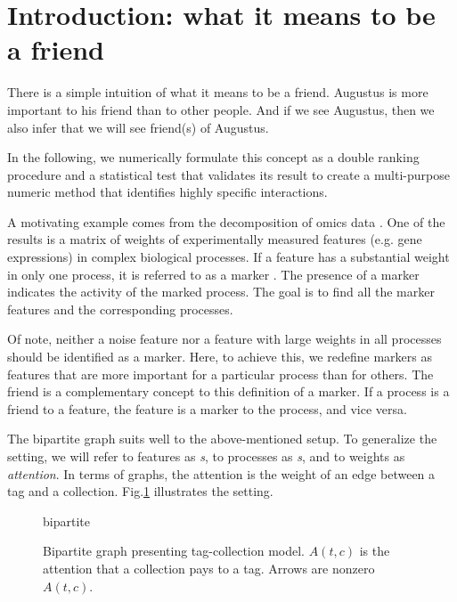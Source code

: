 \documentclass{llncs}
\begin{document}

\section{Introduction: what it means to be a friend}

There is a simple intuition of what it means to be a friend. Augustus is more important to his friend than to other people. And if we see Augustus, then we also infer that we will see friend(s) of Augustus. 

In the following, we numerically formulate this concept as a double ranking procedure and a statistical test that validates its result to create a multi-purpose numeric method that identifies highly specific interactions.

A motivating example comes from the decomposition of omics data 
\cite{fertig_cogaps_2010, stein-obrien_enter_2018}. One of the results is a matrix of weights of experimentally measured features (e.g. gene expressions) in complex biological processes. If a feature has a substantial weight in only one process, it is referred to as a marker \cite{stein-obrien_patternmarkers_2017}. 
The presence of a marker indicates the activity of the marked process.
The goal is to find all the marker features and the corresponding processes.

Of note, neither a noise feature nor a feature with large weights in all processes should be identified as a marker. Here, to achieve this, we redefine markers as features that are more important for a particular process than for others. The friend is a complementary concept to this definition of a marker. If a process is a friend to a feature, the feature is a marker to the process, and vice versa. 

The bipartite graph suits well to the above-mentioned setup. To generalize the setting, we will refer to features as \textit{{\tag}s}, to processes as \textit{{\collection}s}, and to weights as \textit{attention}. In terms of graphs, the attention is the weight of an edge between a tag and a collection. Fig.\ref{fig:nice_name} illustrates the setting.

\begin{figure}
    \centering
    {bipartite}
    \caption{Bipartite graph presenting tag-collection model. $A(t,c)$ is the attention that a collection pays to a tag. Arrows are nonzero $A(t,c)$.}
    \label{fig:nice_name}
\end{figure}
\end{document}
